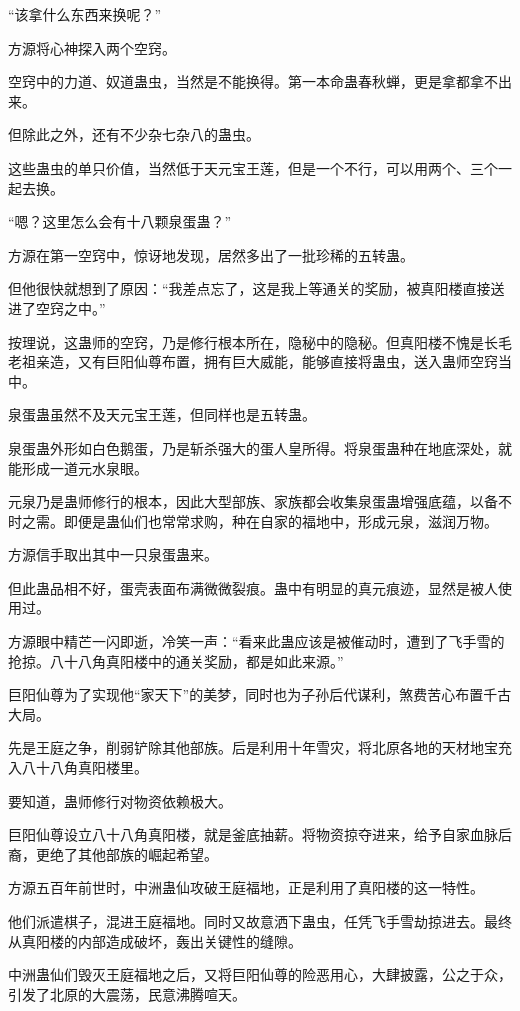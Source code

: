 \begin{this_body}
“该拿什么东西来换呢？”

方源将心神探入两个空窍。

空窍中的力道、奴道蛊虫，当然是不能换得。第一本命蛊春秋蝉，更是拿都拿不出来。

但除此之外，还有不少杂七杂八的蛊虫。

这些蛊虫的单只价值，当然低于天元宝王莲，但是一个不行，可以用两个、三个一起去换。

“嗯？这里怎么会有十八颗泉蛋蛊？”

方源在第一空窍中，惊讶地发现，居然多出了一批珍稀的五转蛊。

但他很快就想到了原因：“我差点忘了，这是我上等通关的奖励，被真阳楼直接送进了空窍之中。”

按理说，这蛊师的空窍，乃是修行根本所在，隐秘中的隐秘。但真阳楼不愧是长毛老祖亲造，又有巨阳仙尊布置，拥有巨大威能，能够直接将蛊虫，送入蛊师空窍当中。

泉蛋蛊虽然不及天元宝王莲，但同样也是五转蛊。

泉蛋蛊外形如白色鹅蛋，乃是斩杀强大的蛋人皇所得。将泉蛋蛊种在地底深处，就能形成一道元水泉眼。

元泉乃是蛊师修行的根本，因此大型部族、家族都会收集泉蛋蛊增强底蕴，以备不时之需。即便是蛊仙们也常常求购，种在自家的福地中，形成元泉，滋润万物。

方源信手取出其中一只泉蛋蛊来。

但此蛊品相不好，蛋壳表面布满微微裂痕。蛊中有明显的真元痕迹，显然是被人使用过。

方源眼中精芒一闪即逝，冷笑一声：“看来此蛊应该是被催动时，遭到了飞手雪的抢掠。八十八角真阳楼中的通关奖励，都是如此来源。”

巨阳仙尊为了实现他“家天下”的美梦，同时也为子孙后代谋利，煞费苦心布置千古大局。

先是王庭之争，削弱铲除其他部族。后是利用十年雪灾，将北原各地的天材地宝充入八十八角真阳楼里。

要知道，蛊师修行对物资依赖极大。

巨阳仙尊设立八十八角真阳楼，就是釜底抽薪。将物资掠夺进来，给予自家血脉后裔，更绝了其他部族的崛起希望。

方源五百年前世时，中洲蛊仙攻破王庭福地，正是利用了真阳楼的这一特性。

他们派遣棋子，混进王庭福地。同时又故意洒下蛊虫，任凭飞手雪劫掠进去。最终从真阳楼的内部造成破坏，轰出关键性的缝隙。

中洲蛊仙们毁灭王庭福地之后，又将巨阳仙尊的险恶用心，大肆披露，公之于众，引发了北原的大震荡，民意沸腾喧天。


\end{this_body}
